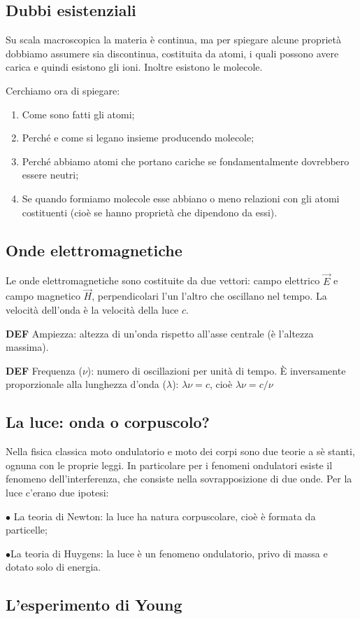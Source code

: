 \subsection{Dubbi esistenziali}
Su scala macroscopica la materia è continua, ma per spiegare alcune proprietà dobbiamo assumere sia discontinua, costituita da atomi, i quali possono avere carica e quindi esistono gli ioni. Inoltre esistono le molecole.

Cerchiamo ora di spiegare:
\begin{enumerate}
    \item Come sono fatti gli atomi;
    \item Perché e come si legano insieme producendo molecole;
    \item Perché abbiamo atomi che portano cariche se fondamentalmente dovrebbero essere neutri;
    \item Se quando formiamo molecole esse abbiano o meno relazioni con gli atomi costituenti (cioè se hanno proprietà che dipendono da essi).
  \end{enumerate}
  
  \subsection{Onde elettromagnetiche}
Le onde elettromagnetiche sono costituite da due vettori: campo elettrico $\vec{E}$ e campo magnetico $\vec{H}$, perpendicolari l'un l'altro che oscillano nel tempo. La velocità dell'onda è la velocità della luce $c$.

\textbf{DEF} Ampiezza: altezza di un'onda rispetto all'asse centrale (è l'altezza massima). 

\textbf{DEF} Frequenza ($\nu$): numero di oscillazioni per unità di tempo. È inversamente proporzionale alla lunghezza d'onda ($\lambda$): $\lambda\nu=c$, cioè $\lambda\nu=c/\nu$

\subsection{La luce: onda o corpuscolo?}
Nella fisica classica moto ondulatorio e moto dei corpi sono due teorie a sè stanti, ognuna con le proprie leggi.
In particolare per i fenomeni ondulatori esiste il fenomeno dell'interferenza, che consiste nella sovrapposizione di due onde.
Per la luce c'erano due ipotesi:

$\bullet$ La teoria di Newton: la luce ha natura corpuscolare, cioè è formata da particelle;

$\bullet$La teoria di Huygens: la luce è un fenomeno ondulatorio, privo di massa e dotato solo di energia.
\subsection{L'esperimento di Young}